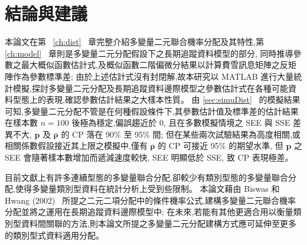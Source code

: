 %
%

\chapter{結論與建議}\label{ch:final}

\noindent 本論文在第~ \ref{ch:dist} ~章完整介紹多變量二元聯合機率分配及其特性,第~ \ref{ch:model} ~章則是多變量二元分配假設下之長期追蹤資料模型的部分,
同時推導參數之最大概似函數估計式,及概似函數二階偏微分結果以計算費雪訊息矩陣之反矩陣作為參數標準差;
由於上述估計式沒有封閉解,故本研究以 MATLAB 進行大量統計模擬,探討多變量二元分配及長期追蹤資料邊際模型之參數估計式在各種可能資料型態上的表現,確認參數估計結果之大樣本性質。
由 \ref{sec:simuDist} ~的模擬結果可知,多變量二元分配不管是在何種假設條件下,其參數估計值及標準差的估計結果在樣本數 $n=100$ 後極為穩定,偏誤趨近於 0,
且在多數模擬情境之 SEE 與 SSE 差異不大, $\bm{p}$ 及 $\bm{\rho}$ 的 CP 落在 90$\%$ 至 95$\%$ 間;
但在某些兩次試驗結果為高度相關,或相關係數假設接近其上限之模擬中,僅有 $\bm{\rho}$ 的 CP 可接近 95$\%$ 的期望水準,
但 $\bm{p}$ 之 SEE 會隨著樣本數增加而遞減速度較快, SEE 明顯低於 SSE, 致 CP 表現極差。

目前文獻上有許多連續型態的多變量聯合分配,卻較少有類別型態的多變量聯合分配,使得多變量類別型資料在統計分析上受到些限制。
本論文藉由 Biswas 和 Hwang (2002) ~\cite{biswas2002new}所提之二元二項分配中的條件機率公式,建構多變量二元聯合機率分配並將之運用在長期追蹤資料邊際模型中;
在未來,若能有其他更適合用以衡量類別型資料間關聯的方法,則本論文所提之多變量二元分配建構方式應可延伸至更多的類別型式資料適用分配。

%



